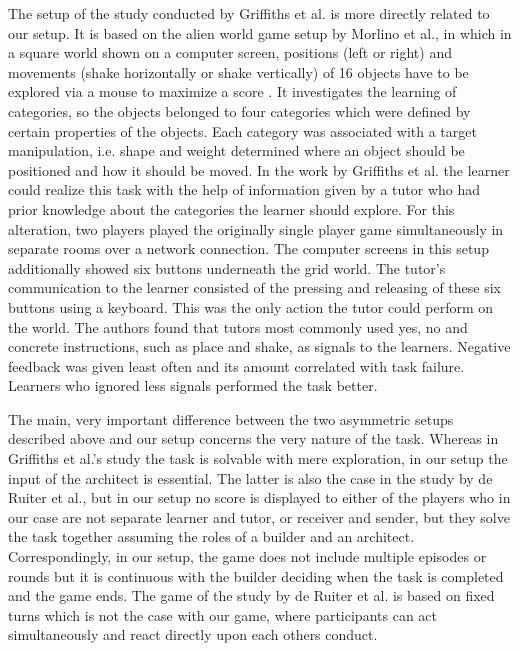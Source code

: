The setup of the study conducted by Griffiths et al. \cite{griffiths2012bottom} is more directly related to our setup. 
It is based on the alien world game setup by Morlino et al., in which in a square world shown on a computer screen, positions (left or right) and movements (shake horizontally or shake vertically) of 16 objects have to be explored via a mouse to maximize a score \cite{morlino2010developing}. It investigates the learning of categories, so the objects belonged to four categories which were defined by certain properties of the objects. Each category was associated with a target manipulation, i.e. shape and weight determined where an object should be positioned and how it should be moved. In the work by Griffiths et al. the learner could realize this task with the help of information given by a tutor who had prior knowledge about the categories the learner should explore. For this alteration, two players played the originally single player game simultaneously in separate rooms over a network connection. The computer screens in this setup additionally showed six buttons underneath the grid world. The tutor's communication to the learner consisted of the pressing and releasing of these six buttons using a keyboard. This was the only action the tutor could perform on the world.
The authors found that tutors most commonly used yes, no and concrete instructions, such as place and shake, as signals to the learners. Negative feedback was given least often and its amount correlated with task failure. Learners who ignored less signals performed the task better.\par
The main, very important difference between the two asymmetric setups described above and our setup concerns the very nature of the task. Whereas in Griffiths et al.'s study the task is solvable with mere exploration, in our setup the input of the architect is essential. The latter is also the case in the study by de Ruiter et al., but in our setup no score is displayed to either of the players who in our case are not separate learner and tutor, or receiver and sender, but they solve the task together assuming the roles of a builder and an architect. Correspondingly, in our setup, the game does not include multiple episodes or rounds but it is continuous with the builder deciding when the task is completed and the game ends. The game of the study by de Ruiter et al. is based on fixed turns which is not the case with our game, where participants can act simultaneously and react directly upon each others conduct.

